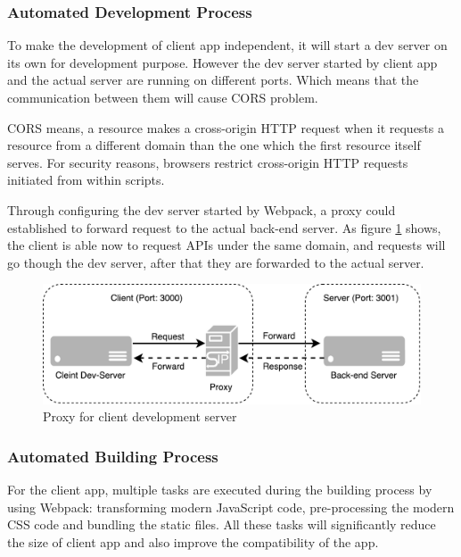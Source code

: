 \subsubsection{Automated Development Process}
To make the development of client app independent, it will start a dev server on its own for development purpose. However the dev server started by client app and the actual server are running on different ports. Which means that the communication between them will cause CORS problem.

CORS means, a resource makes a cross-origin HTTP request when it requests a resource from a different domain than the one which the first resource itself serves. For security reasons, browsers restrict cross-origin HTTP requests initiated from within scripts. \cite{CORS}

Through configuring the dev server started by Webpack, a proxy could established to forward request to the actual back-end server. As figure \ref{fig:proxy-server-imp} shows, the client is able now to request APIs under the same domain, and requests will go though the dev server, after that they are forwarded to the actual server.

\begin{figure}[!htbp]
  \centering
    \includegraphics[width=1\textwidth]{Figures/imp-proxy-server.pdf}
  \caption{Proxy for client development server}
  \label{fig:proxy-server-imp}
\end{figure}


\subsubsection{Automated Building Process}

For the client app, multiple tasks are executed during the building process by using Webpack: transforming modern JavaScript code, pre-processing the modern CSS code and bundling the static files. All these tasks will significantly reduce the size of client app and also improve the compatibility of the app.

